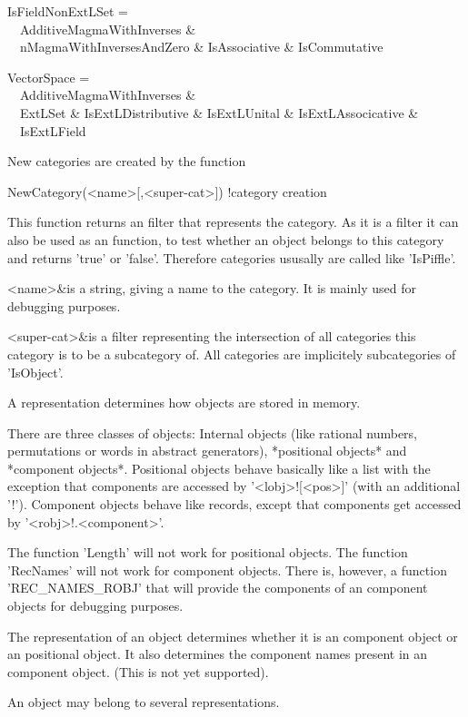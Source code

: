 IsFieldNonExtLSet = \\
\ \ AdditiveMagmaWithInverses \& \\
\ \ nMagmaWithInversesAndZero \& IsAssociative \& IsCommutative

VectorSpace = \\
\ \ AdditiveMagmaWithInverses \& \\
\ \ ExtLSet \& IsExtLDistributive \& IsExtLUnital \& IsExtLAssocicative \& \\
\ \ IsExtLField

New categories are created by the function

\> NewCategory(<name>[,<super-cat>]) !{category creation}

This function returns an filter that represents the category. As it is a filter
it can also be used as an function, to test whether an object belongs to this
category and returns 'true' or 'false'. Therefore categories ususally are
called like 'IsPiffle'.

\beginitems
<name>&is a string, giving a name to the category. It is mainly used for
debugging purposes.

<super-cat>&is a filter representing the intersection of all categories this
category is to be a subcategory of. All categories are implicitely
subcategories of 'IsObject'.
\enditems



A representation determines how objects are stored in memory.

There are three classes of objects: Internal objects (like rational numbers,
permutations or words in abstract generators), *positional objects* and
*component objects*. Positional objects behave basically like a list with
the exception that components are accessed by '<lobj>\/![<pos>]'
(with an additional '!'). Component objects behave
like records, except that components get accessed by '<robj>\/!.<component>'.

\danger
The function 'Length' will not work for positional objects. The function
'RecNames' will not work for component objects. There is, however, a
function 'REC_NAMES_ROBJ' that will provide the components of an component
objects for debugging purposes.

The representation of an object determines whether it is an component
object or an positional object. It also determines the component names
present in an component object.
(This is not yet supported).

An object may belong to several representations.

